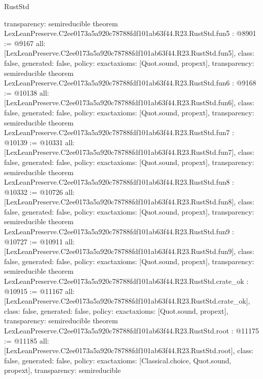 \begin{lexlean}{RustStd}
\begin{coremodule}
{  transparency: semireducible
}
theorem LexLeanPreserve.C2ee0173a5a920c78788fdf101ab63f44.R23.RustStd.fun5 : @8901 := @9167 {
  all: [LexLeanPreserve.C2ee0173a5a920c78788fdf101ab63f44.R23.RustStd.fun5],
  class: false,
  generated: false,
  policy: exact{axioms: [Quot.sound, propext]},
  transparency: semireducible
}
theorem LexLeanPreserve.C2ee0173a5a920c78788fdf101ab63f44.R23.RustStd.fun6 : @9168 := @10138 {
  all: [LexLeanPreserve.C2ee0173a5a920c78788fdf101ab63f44.R23.RustStd.fun6],
  class: false,
  generated: false,
  policy: exact{axioms: [Quot.sound, propext]},
  transparency: semireducible
}
theorem LexLeanPreserve.C2ee0173a5a920c78788fdf101ab63f44.R23.RustStd.fun7 : @10139 := @10331 {
  all: [LexLeanPreserve.C2ee0173a5a920c78788fdf101ab63f44.R23.RustStd.fun7],
  class: false,
  generated: false,
  policy: exact{axioms: [Quot.sound, propext]},
  transparency: semireducible
}
theorem LexLeanPreserve.C2ee0173a5a920c78788fdf101ab63f44.R23.RustStd.fun8 : @10332 := @10726 {
  all: [LexLeanPreserve.C2ee0173a5a920c78788fdf101ab63f44.R23.RustStd.fun8],
  class: false,
  generated: false,
  policy: exact{axioms: [Quot.sound, propext]},
  transparency: semireducible
}
theorem LexLeanPreserve.C2ee0173a5a920c78788fdf101ab63f44.R23.RustStd.fun9 : @10727 := @10911 {
  all: [LexLeanPreserve.C2ee0173a5a920c78788fdf101ab63f44.R23.RustStd.fun9],
  class: false,
  generated: false,
  policy: exact{axioms: [Quot.sound, propext]},
  transparency: semireducible
}
theorem LexLeanPreserve.C2ee0173a5a920c78788fdf101ab63f44.R23.RustStd.crate_ok : @10915 := @11167 {
  all: [LexLeanPreserve.C2ee0173a5a920c78788fdf101ab63f44.R23.RustStd.crate_ok],
  class: false,
  generated: false,
  policy: exact{axioms: [Quot.sound, propext]},
  transparency: semireducible
}
theorem LexLeanPreserve.C2ee0173a5a920c78788fdf101ab63f44.R23.RustStd.root : @11175 := @11185 {
  all: [LexLeanPreserve.C2ee0173a5a920c78788fdf101ab63f44.R23.RustStd.root],
  class: false,
  generated: false,
  policy: exact{axioms: [Classical.choice, Quot.sound, propext]},
  transparency: semireducible
}


\end{coremodule}
\end{lexlean}
